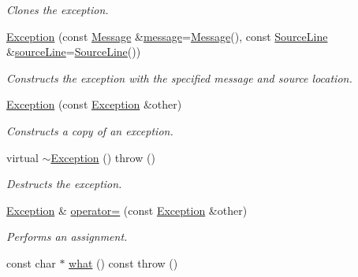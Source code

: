 \begin{DoxyCompactItemize}
\begin{DoxyCompactList}\small\item\em Clones the exception. \end{DoxyCompactList}\item 
\hyperlink{class_exception_aac5e9386080a8eac2edebf02c8169ecc}{Exception} (const \hyperlink{class_message}{Message} \&\hyperlink{class_exception_aab5c1504a18016fdfe7574eb81f59ac6}{message}=\hyperlink{class_message}{Message}(), const \hyperlink{class_source_line}{Source\+Line} \&\hyperlink{class_exception_a67f40ff3ea7f1c07e46222c38dcbaf43}{source\+Line}=\hyperlink{class_source_line}{Source\+Line}())
\begin{DoxyCompactList}\small\item\em Constructs the exception with the specified message and source location. \end{DoxyCompactList}\item 
\hyperlink{class_exception_ae0fd52e62283ee92c085d767d0aab736}{Exception} (const \hyperlink{class_exception}{Exception} \&other)
\begin{DoxyCompactList}\small\item\em Constructs a copy of an exception. \end{DoxyCompactList}\item 
\hypertarget{class_exception_ad1ba411de295ef2eeb02ba26284a829a}{virtual \hyperlink{class_exception_ad1ba411de295ef2eeb02ba26284a829a}{$\sim$\+Exception} ()  throw ()}\label{class_exception_ad1ba411de295ef2eeb02ba26284a829a}

\begin{DoxyCompactList}\small\item\em Destructs the exception. \end{DoxyCompactList}\item 
\hypertarget{class_exception_a71c844ee3ac32b7656c24386e9ab60a0}{\hyperlink{class_exception}{Exception} \& \hyperlink{class_exception_a71c844ee3ac32b7656c24386e9ab60a0}{operator=} (const \hyperlink{class_exception}{Exception} \&other)}\label{class_exception_a71c844ee3ac32b7656c24386e9ab60a0}

\begin{DoxyCompactList}\small\item\em Performs an assignment. \end{DoxyCompactList}\item 
\hypertarget{class_exception_a45642915395d3b813fedc2593fbcb8bb}{const char $\ast$ \hyperlink{class_exception_a45642915395d3b813fedc2593fbcb8bb}{what} () const   throw ()}\label{class_exception_a45642915395d3b813fedc2593fbcb8bb}


\end{DoxyCompactItemize}
